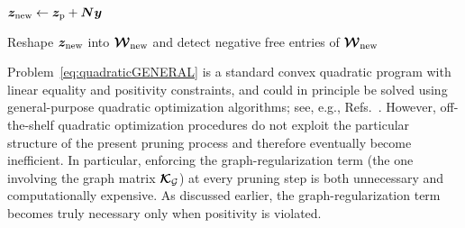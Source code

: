 \documentclass[preprint,10pt]{elsarticle}  %
\begin{document}
\begin{algorithm}[!ht]
{    \(
    \bm{z}_{\mathrm{new}}
    \leftarrow
    \bm{z}_{\mathrm{p}}+\bm{N}\bm{y}
    \)

    Reshape \(\bm{z}_{\mathrm{new}}\) into \(\boldsymbol{\mathcal{W}}_{\mathrm{new}}\) and   detect negative free entries of \(\boldsymbol{\mathcal{W}}_{\mathrm{new}}\)

}

\caption{\textsc{PruneStep}: Active-set strategy for solving the quadratic graph-regularized
redistribution problem \ref{eq:quadraticGENERAL},  associated with the tentative pruning of one
integration point. This local redistribution procedure is
repeatedly invoked within
Algorithm~\ref{alg:graph_candidate_sweep} to evaluate different feasible
candidate eliminations.
\label{alg:prune_step_optionB}}
\end{algorithm}


Problem~\eqref{eq:quadraticGENERAL} is a standard convex quadratic
program with linear equality and positivity constraints, and could in
principle be solved using general-purpose quadratic optimization
algorithms; see, e.g., Refs.~\cite{boyd2004convex,Nocedal1999}.
However, off-the-shelf quadratic optimization procedures do not exploit
the particular structure of the present pruning process and therefore
eventually become inefficient. In particular, enforcing the
graph-regularization term (the one involving the graph matrix
\(\boldsymbol{\mathcal{K}}_{\mathcal{G}}\)) at every pruning step is both unnecessary and
computationally expensive. As discussed earlier, the graph-regularization
term becomes truly necessary only when positivity is violated.
\end{document}
